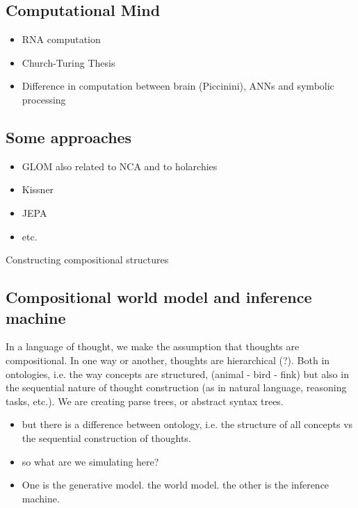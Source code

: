 \subsection{Computational Mind}
\begin{itemize}
    \item RNA computation
    \item Church-Turing Thesis
    \item Difference in computation between brain (Piccinini), ANNs and symbolic processing
\end{itemize}

\subsection{Some approaches}

\begin{itemize}
    \item GLOM also related to NCA and to holarchies
    \item Kissner
    \item JEPA
    \item etc. 
\end{itemize}




Constructing compositional structures

\subsection{Compositional world model and inference machine}

In a language of thought, we make the assumption that thoughts are compositional. In one way or another, thoughts are hierarchical (?).
Both in ontologies, i.e. the way concepts are structured, (animal - bird - fink) but also in the sequential nature of thought construction (as in natural language, reasoning tasks, etc.). We are creating parse trees, or abstract syntax trees. 

\begin{itemize}
    \item but there is a difference between ontology, i.e. the structure of all concepts vs the sequential construction of thoughts.
    \item so what are we simulating here?
    \item One is the generative model. the world model. the other is the inference machine. 
\end{itemize}

